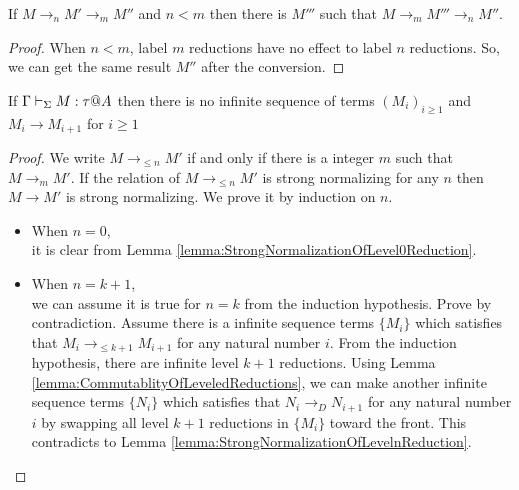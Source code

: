 \begin{lemma}
    \label{lemma:CommutablityOfLeveledReductions}
    If \( M \longrightarrow_n M' \longrightarrow_m M'' \) and \( n < m \) then there is \( M''' \) such that \( M \longrightarrow_m M''' \longrightarrow_n M'' \).
\end{lemma}

\begin{proof}
    When \( n < m \), label \( m \)
    reductions have no effect to label \( n \) reductions. So, we can get the
    same result \( M'' \) after the conversion.
\end{proof}

\begin{theorem}
    \label{theorem:StrongNormalization}
    If \( \G\V M:\tau@A \) then there is no infinite sequence of terms $(M_i)_{i\ge1}$ and $M_i \longrightarrow M_{i+1}$ for $i\ge 1$
\end{theorem}

\begin{proof}
    We write \( M \longrightarrow_{\le n} M' \) if and only if there is a integer \( m \) such that \( M \longrightarrow_m M' \).
    If the relation of \( M \longrightarrow_{\le n} M' \) is strong normalizing for any \( n \) then \( M \longrightarrow M' \) is strong normalizing.
    We prove it by induction on \( n \).
    \begin{itemize}
        \item When \( n = 0 \), \\
            it is clear from Lemma \ref{lemma:StrongNormalizationOfLevel0Reduction}.
        \item When \( n = k + 1 \), \\
            we can assume it is true for \( n = k \) from the induction
            hypothesis. Prove by contradiction. Assume there is a infinite
            sequence terms $\{M_i\}$ which satisfies that $M_i
            \longrightarrow_{\le k+1} M_{i+1}$ for any natural number \( i \).
            From the induction hypothesis, there are infinite level \( k + 1 \)
            reductions. Using Lemma
            \ref{lemma:CommutablityOfLeveledReductions}, we can make another
            infinite sequence terms $\{N_i\}$ which satisfies that $N_i
            \longrightarrow_D N_{i+1}$ for any natural number \( i \) by
            swapping all level \( k + 1 \) reductions in \( \{ M_i \} \) toward
            the front. This contradicts to Lemma
            \ref{lemma:StrongNormalizationOfLevelnReduction}.
    \end{itemize}
\end{proof}

